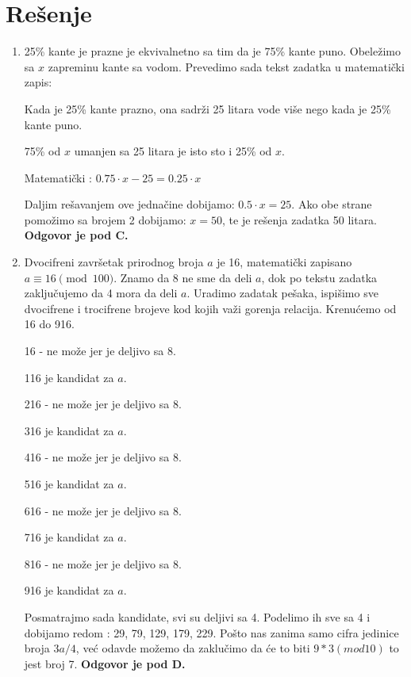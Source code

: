\documentclass[a4paper,12pt]{report}
\begin{document}

\newpage

\section{Re\v{s}enje}
\begin{enumerate}[1.]

\item 25\% kante je prazne je ekvivalnetno sa tim da je 75\% kante puno. Obele\v{z}imo sa $x$ zapreminu kante sa vodom. Prevedimo sada tekst zadatka u matemati\v{c}ki zapis:
\par Kada je 25\% kante prazno, ona sadr\v{z}i 25 litara vode vi\v{s}e nego kada je 25\% kante puno.
\par 75\% od $x$ umanjen sa 25 litara je isto sto i 25\% od $x$.
\par Matemati\v{c}ki : $ 0.75 \cdot x - 25 = 0.25 \cdot x$
\par Daljim re\v{s}avanjem ove jedna\v{c}ine dobijamo: $ 0.5 \cdot x = 25$. Ako obe strane pomo\v{z}imo sa brojem 2 dobijamo: $x = 50$, te je re\v{s}enja zadatka 50 litara. \textbf{Odgovor je pod C.}

\item Dvocifreni zavr\v{s}etak prirodnog broja $a$ je 16, matemati\v{c}ki zapisano $ a \equiv 16 \pmod{100}$. Znamo da 8 ne sme da deli $a$, dok po tekstu zadatka zaklju\v{c}ujemo da 4 mora da deli $a$. Uradimo zadatak pe\v{s}aka, ispi\v{s}imo sve dvocifrene i trocifrene brojeve kod kojih va\v{z}i gorenja relacija. Krenu\'{c}emo od 16 do 916.
\par 16 - ne mo\v{z}e jer je deljivo sa 8.
\par 116 je kandidat za $a$.
\par 216 - ne mo\v{z}e jer je deljivo sa 8.
\par 316 je kandidat za $a$.
\par 416 - ne mo\v{z}e jer je deljivo sa 8.
\par 516 je kandidat za $a$.
\par 616 - ne mo\v{z}e jer je deljivo sa 8.
\par 716 je kandidat za $a$.
\par 816 - ne mo\v{z}e jer je deljivo sa 8.
\par 916 je kandidat za $a$.
\par Posmatrajmo sada kandidate, svi su deljivi sa 4. Podelimo ih sve sa 4 i dobijamo redom : 29, 79, 129, 179, 229. Po\v{s}to nas zanima samo cifra jedinice broja $3a/4$, ve\'{c} odavde mo\v{z}emo da zaklu\v{c}imo da \'{c}e to biti $9 * 3 (mod 10)$ to jest broj 7. \textbf{Odgovor je pod D.}


\end{enumerate}
\end{document}
